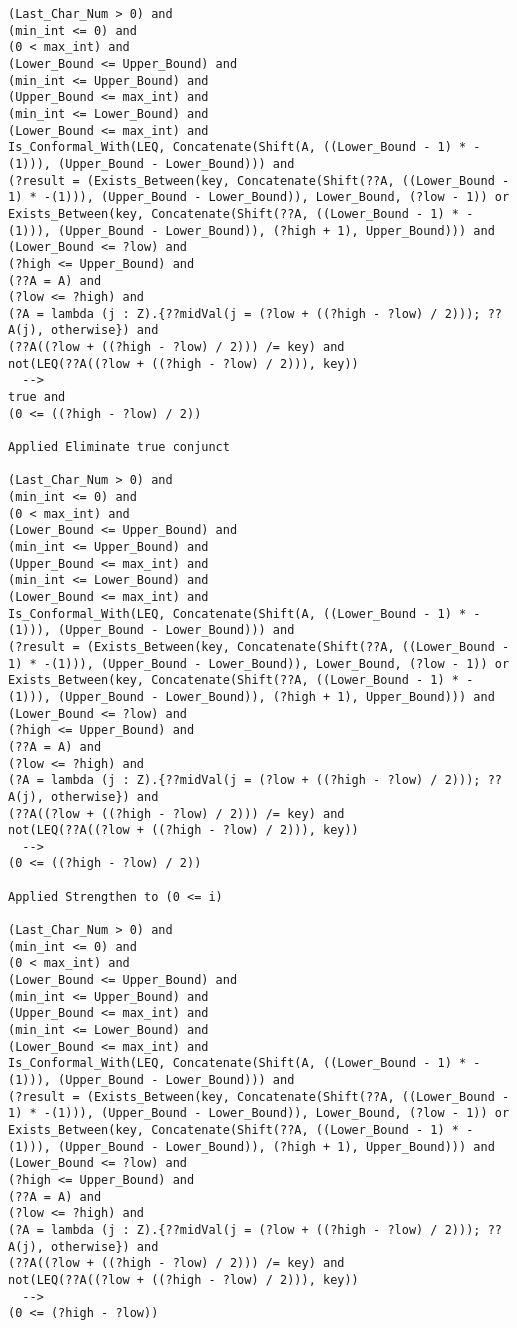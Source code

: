 \begin{lstlisting}[language=resolve]
(Last_Char_Num > 0) and
(min_int <= 0) and
(0 < max_int) and
(Lower_Bound <= Upper_Bound) and
(min_int <= Upper_Bound) and
(Upper_Bound <= max_int) and
(min_int <= Lower_Bound) and
(Lower_Bound <= max_int) and
Is_Conformal_With(LEQ, Concatenate(Shift(A, ((Lower_Bound - 1) * -(1))), (Upper_Bound - Lower_Bound))) and
(?result = (Exists_Between(key, Concatenate(Shift(??A, ((Lower_Bound - 1) * -(1))), (Upper_Bound - Lower_Bound)), Lower_Bound, (?low - 1)) or Exists_Between(key, Concatenate(Shift(??A, ((Lower_Bound - 1) * -(1))), (Upper_Bound - Lower_Bound)), (?high + 1), Upper_Bound))) and
(Lower_Bound <= ?low) and
(?high <= Upper_Bound) and
(??A = A) and
(?low <= ?high) and
(?A = lambda (j : Z).{??midVal(j = (?low + ((?high - ?low) / 2))); ??A(j), otherwise}) and
(??A((?low + ((?high - ?low) / 2))) /= key) and
not(LEQ(??A((?low + ((?high - ?low) / 2))), key))
  -->
true and
(0 <= ((?high - ?low) / 2))

Applied Eliminate true conjunct

(Last_Char_Num > 0) and
(min_int <= 0) and
(0 < max_int) and
(Lower_Bound <= Upper_Bound) and
(min_int <= Upper_Bound) and
(Upper_Bound <= max_int) and
(min_int <= Lower_Bound) and
(Lower_Bound <= max_int) and
Is_Conformal_With(LEQ, Concatenate(Shift(A, ((Lower_Bound - 1) * -(1))), (Upper_Bound - Lower_Bound))) and
(?result = (Exists_Between(key, Concatenate(Shift(??A, ((Lower_Bound - 1) * -(1))), (Upper_Bound - Lower_Bound)), Lower_Bound, (?low - 1)) or Exists_Between(key, Concatenate(Shift(??A, ((Lower_Bound - 1) * -(1))), (Upper_Bound - Lower_Bound)), (?high + 1), Upper_Bound))) and
(Lower_Bound <= ?low) and
(?high <= Upper_Bound) and
(??A = A) and
(?low <= ?high) and
(?A = lambda (j : Z).{??midVal(j = (?low + ((?high - ?low) / 2))); ??A(j), otherwise}) and
(??A((?low + ((?high - ?low) / 2))) /= key) and
not(LEQ(??A((?low + ((?high - ?low) / 2))), key))
  -->
(0 <= ((?high - ?low) / 2))

Applied Strengthen to (0 <= i)

(Last_Char_Num > 0) and
(min_int <= 0) and
(0 < max_int) and
(Lower_Bound <= Upper_Bound) and
(min_int <= Upper_Bound) and
(Upper_Bound <= max_int) and
(min_int <= Lower_Bound) and
(Lower_Bound <= max_int) and
Is_Conformal_With(LEQ, Concatenate(Shift(A, ((Lower_Bound - 1) * -(1))), (Upper_Bound - Lower_Bound))) and
(?result = (Exists_Between(key, Concatenate(Shift(??A, ((Lower_Bound - 1) * -(1))), (Upper_Bound - Lower_Bound)), Lower_Bound, (?low - 1)) or Exists_Between(key, Concatenate(Shift(??A, ((Lower_Bound - 1) * -(1))), (Upper_Bound - Lower_Bound)), (?high + 1), Upper_Bound))) and
(Lower_Bound <= ?low) and
(?high <= Upper_Bound) and
(??A = A) and
(?low <= ?high) and
(?A = lambda (j : Z).{??midVal(j = (?low + ((?high - ?low) / 2))); ??A(j), otherwise}) and
(??A((?low + ((?high - ?low) / 2))) /= key) and
not(LEQ(??A((?low + ((?high - ?low) / 2))), key))
  -->
(0 <= (?high - ?low))


\end{lstlisting}
